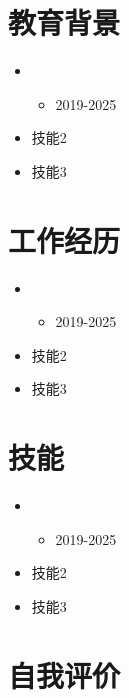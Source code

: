 \documentclass{resume}
\begin{document}

\section{教育背景}

\begin{itemize}
    \item {}
    \begin{itemize}
        \item 2019-2025
    \end{itemize}
    \item 技能2
    \item 技能3
\end{itemize}

\section{工作经历}

\begin{itemize}
    \item {}
    \begin{itemize}
        \item 2019-2025
    \end{itemize}
    \item 技能2
    \item 技能3
\end{itemize}

\section{技能}
\begin{itemize}
    \item {}
    \begin{itemize}
        \item 2019-2025
    \end{itemize}
    \item 技能2
    \item 技能3
\end{itemize}

\section{自我评价}
\end{document}
